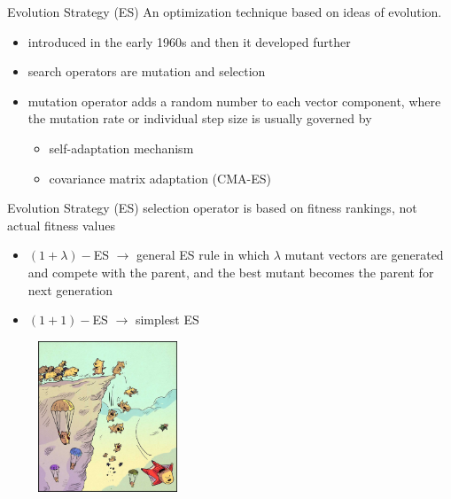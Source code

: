 \begin{frame}{Evolution Strategy (ES) }
An optimization technique based on ideas of evolution.   
\begin{itemize}
    \item introduced in the early 1960s and then it developed further
    \item search operators are mutation and selection 
    \item mutation operator adds a random number to each vector component, where the mutation rate or individual step size is usually governed by 
    \begin{itemize}
        \item self-adaptation mechanism 
        \item covariance matrix adaptation (CMA-ES) 
    \end{itemize}
\end{itemize}
\begin{center}
\end{center}

\end{frame}

\begin{frame}{Evolution Strategy (ES)}
selection operator is based on fitness rankings, not actual fitness values  
\begin{itemize}
    \item $(1+\lambda)-$ES $ \rightarrow$ general ES rule in which $\lambda$ mutant vectors are generated and compete with the parent, and the best mutant becomes the parent for next generation
    \item $(1+1)-$ES $\rightarrow$ simplest ES
    \end{itemize}

\begin{center}
\includegraphics[width=6cm, height=4.5cm]{new_images/ES.jpeg}    
\end{center}

\end{frame}

